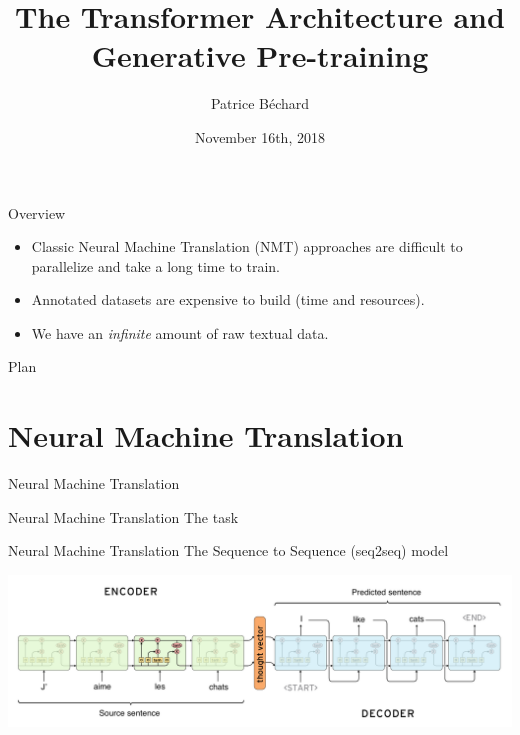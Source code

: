 \documentclass[aspectratio=169]{beamer}
\author{Patrice B\'echard}
\institute[Intact]{
\small{Intact Data Lab} \\
\textit{patrice.bechard@intact.net}
}
\title{The Transformer Architecture and Generative Pre-training}
\date{November 16th, 2018}
\begin{document}

\begin{frame}[plain, t]
  \titlepage
\end{frame}


\begin{frame}{Overview}

\vspace{.5cm}

\begin{itemize}
	\item Classic Neural Machine Translation (NMT) approaches are difficult to parallelize and take a long time to train.
	\item Annotated datasets are expensive to build (time and resources).
	\item We have an \textit{infinite} amount of raw textual data.
\end{itemize}

\end{frame}


\begin{frame}{Plan}
  \tableofcontents
\end{frame}

\section{Neural Machine Translation}

\begin{frame}{Neural Machine Translation}
\end{frame}

\begin{frame}{Neural Machine Translation}
The task
\end{frame}

\begin{frame}{Neural Machine Translation}
The Sequence to Sequence (seq2seq) model

\includegraphics[width=\textwidth]{figures/seq2seq}

\end{frame}
\end{document}
